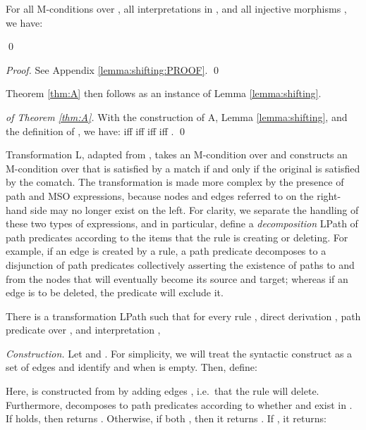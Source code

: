 \documentclass{llncs}
\begin{document}
\begin{lemma}\rm\label{lemma:shifting}
	For all M-conditions  over , all interpretations  in , and all injective morphisms , we have:
	
	\qed
\end{lemma}

\begin{proof}
	See Appendix \ref{lemma:shifting:PROOF}.
	\qed
\end{proof}

Theorem \ref{thm:A} then follows as an instance of Lemma \ref{lemma:shifting}.

\begin{proof}[of Theorem \ref{thm:A}]
	With the construction of A, Lemma \ref{lemma:shifting}, and the definition of , we have:  iff  iff  iff  iff .
	\qed
\end{proof}


Transformation L, adapted from \cite{Habel-Pennemann09a}, takes an M-condition over  and constructs an M-condition over  that is satisfied by a match if and only if the original is satisfied by the comatch. The transformation is made more complex by the presence of path and MSO expressions, because nodes and edges referred to on the right-hand side may no longer exist on the left. For clarity, we separate the handling of these two types of expressions, and in particular, define a \emph{decomposition} LPath of path predicates according to the items that the rule is creating or deleting. For example, if an edge is created by a rule, a path predicate decomposes to a disjunction of path predicates collectively asserting the existence of paths to and from the nodes that will eventually become its source and target; whereas if an edge is to be deleted, the predicate will exclude it.



\begin{proposition}\label{prop:LPath}\rm
	There is a transformation LPath such that for every rule , direct derivation , path predicate  over , and interpretation ,
	
\end{proposition}

\noindent \emph{Construction.} Let  and . For simplicity, we will treat the syntactic construct  as a set of edges and identify  and  when  is empty. Then, define:


\noindent Here,  is constructed from  by adding edges , i.e.\ that the rule will delete. Furthermore,  decomposes to path predicates according to whether  and  exist in . If  holds, then  returns . Otherwise, if both , then it returns . If , it returns:
\end{document}
